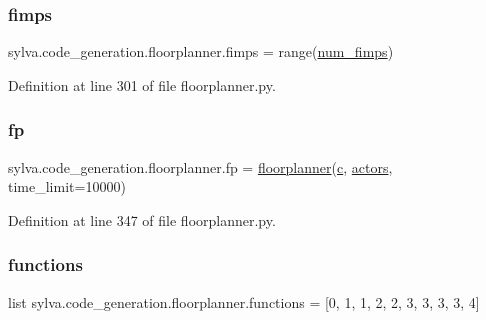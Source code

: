 \subsubsection{\texorpdfstring{fimps}{fimps}}
{\footnotesize\ttfamily sylva.\+code\+\_\+generation.\+floorplanner.\+fimps = range(\hyperlink{namespacesylva_1_1code__generation_1_1floorplanner_aa3c18a3eb7fa3c7977cf8602c6570793}{num\+\_\+fimps})}



Definition at line 301 of file floorplanner.\+py.

\mbox{\label{namespacesylva_1_1code__generation_1_1floorplanner_aef6ab7f5eecb6c140149e1ea30161d62}} 
\subsubsection{\texorpdfstring{fp}{fp}}
{\footnotesize\ttfamily sylva.\+code\+\_\+generation.\+floorplanner.\+fp = \hyperlink{classsylva_1_1code__generation_1_1floorplanner_1_1floorplanner}{floorplanner}(\hyperlink{namespacesylva_1_1code__generation_1_1floorplanner_a5ed98e48cee4fdb98cc0772655281931}{c}, \hyperlink{namespacesylva_1_1code__generation_1_1floorplanner_a0a7a26c9bd92be126f3b70c232ba81cd}{actors}, time\+\_\+limit=10000)}



Definition at line 347 of file floorplanner.\+py.

\mbox{\label{namespacesylva_1_1code__generation_1_1floorplanner_ad22d3fbef637b5348ba1001937e142d7}} 
\subsubsection{\texorpdfstring{functions}{functions}}
{\footnotesize\ttfamily list sylva.\+code\+\_\+generation.\+floorplanner.\+functions = \mbox{[}0, 1, 1, 2, 2, 3, 3, 3, 3, 4\mbox{]}}



